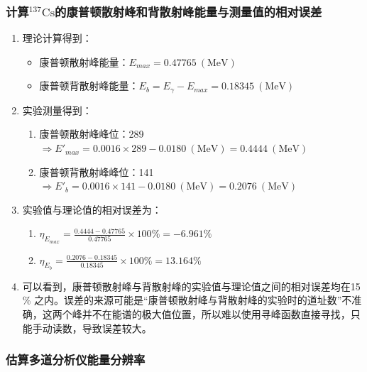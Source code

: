 \documentclass[dvipsnames, svgnames,a4paper,11pt]{article}
\begin{document}
	\subsubsection{计算$^{137}\mathrm{Cs}$的康普顿散射峰和背散射峰能量与测量值的相对误差}

		\begin{enumerate}
			\item 理论计算得到：
				\begin{itemize}
					\item 康普顿散射峰能量：$E_{max} = 0.47765 \ \mathrm{(MeV)}$
					\item 康普顿背散射峰能量：$E_b = E_{\gamma} - E_{max} = 0.18345 \ \mathrm{(MeV)}$
				\end{itemize}

			\item 实验测量得到：
				\begin{enumerate}
					\item 康普顿散射峰峰位：289 $\Rightarrow E'_{max} = 0.0016 \times 289 - 0.0180 \ \mathrm{(MeV)} = 0.4444 \ \mathrm{(MeV)}$
					\item 康普顿背散射峰峰位：141 $\Rightarrow E'_b = 0.0016 \times 141 - 0.0180 \ \mathrm{(MeV)} = 0.2076 \ \mathrm{(MeV)}$
				\end{enumerate}

			\item 实验值与理论值的相对误差为：
				\begin{enumerate}
					\item $\eta_{E_{max}} = \frac{0.4444 - 0.47765}{0.47765} \times 100 \% =  -6.961 \% $
					\item $\eta_{E_b} = \frac{0.2076 - 0.18345}{0.18345} \times 100 \% = 13.164 \% $
				\end{enumerate}

			
			\item 可以看到，康普顿散射峰与背散射峰的实验值与理论值之间的相对误差均在15 \% 之内。误差的来源可能是“康普顿散射峰与背散射峰的实验时的道址数”不准确，这两个峰并不在能谱的极大值位置，所以难以使用寻峰函数直接寻找，只能手动读数，导致误差较大。 


		\end{enumerate}





	\subsubsection{估算多道分析仪能量分辨率}
\end{document}
